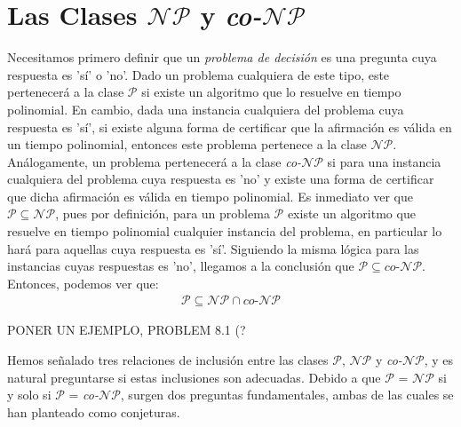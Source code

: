 \documentclass{article}
\begin{document}
\section*{Las Clases \textit{\textbf{$\mathcal{N}\mathcal{P}$}} y
\textit{\textbf{co-$\mathcal{N}\mathcal{P}$}}}
\indent Necesitamos primero definir que un \textit{problema de decisión}
es una pregunta cuya respuesta es 'sí' o 'no'. Dado un problema cualquiera
de este tipo, este pertenecerá a la clase \textit{$\mathcal{P}$} si existe un
algoritmo que lo resuelve en tiempo polinomial. En cambio, dada una instancia
cualquiera del problema cuya respuesta es 'sí', si existe alguna forma de 
certificar que la afirmación es válida en un tiempo polinomial, entonces este problema
pertenece a la clase \textit{$\mathcal{N}\mathcal{P}$}. Análogamente, un problema pertenecerá a la clase \textit{co-$\mathcal{N}\mathcal{P}$} si para una instancia cualquiera del problema cuya respuesta es 'no' y existe una forma de certificar que dicha afirmación es válida en tiempo polinomial.\newline
\indent Es inmediato ver que $\textit{$\mathcal{P}$} \subseteq \textit{$\mathcal{N}\mathcal{P}$}$, pues por definición, para un problema \textit{$\mathcal{P}$} existe un algoritmo que resuelve en tiempo polinomial cualquier instancia del problema, en particular lo hará para aquellas cuya respuesta es 'sí'. Siguiendo la misma lógica para las instancias cuyas respuestas es 'no', llegamos a la conclusión que $\textit{$\mathcal{P}$} \subseteq \textit{co-$\mathcal{N}\mathcal{P}$}$. Entonces, podemos ver que:\newline
\begin{align*}
    \textit{$\mathcal{P}$} \subseteq \textit{$\mathcal{N}\mathcal{P}$} \cap \textit{co-$\mathcal{N}\mathcal{P}$}
\end{align*} 


\indent PONER UN EJEMPLO, PROBLEM 8.1 (?  \newline
\newline
\newline
\newline



\indent Hemos señalado tres relaciones de inclusión entre las clases \textit{$\mathcal{P}$}, \textit{$\mathcal{N}\mathcal{P}$} y \textit{co-$\mathcal{N}\mathcal{P}$}, y es natural preguntarse si estas inclusiones son adecuadas. Debido a que \textit{$\mathcal{P}$} = \textit{$\mathcal{N}\mathcal{P}$} si y solo si \textit{$\mathcal{P}$} = \textit{co-$\mathcal{N}\mathcal{P}$}, surgen dos preguntas fundamentales, ambas de las cuales se han planteado como conjeturas. \newline
\end{document}
